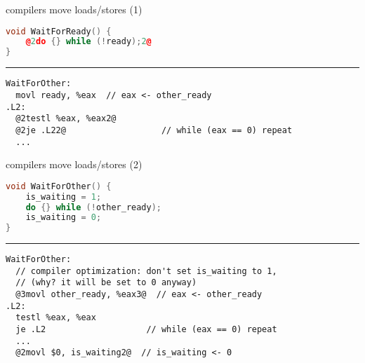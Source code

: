 \begin{frame}[fragile,label=compReorder]{compilers move loads/stores (1)}
\begin{lstlisting}[language=C++,style=small,
    moredelim={**[is][\btHL<2|handout:2>]{@2}{2@}},
    moredelim={**[is][\btHL<3|handout:3>]{@3}{3@}},
    moredelim={**[is][\btHL<4|handout:4>]{@4}{4@}},
    moredelim={**[is][\btHL<5|handout:5>]{@5}{5@}},
]
void WaitForReady() {
    @2do {} while (!ready);2@
}
\end{lstlisting}
\hrule
\begin{lstlisting}[language=myasm,style=smaller,
    moredelim={**[is][\btHL<2|handout:2>]{@2}{2@}},
    moredelim={**[is][\btHL<3|handout:3>]{@3}{3@}},
    moredelim={**[is][\btHL<4|handout:4>]{@4}{4@}},
    moredelim={**[is][\btHL<5|handout:5>]{@5}{5@}},
]
WaitForOther:
  movl ready, %eax  // eax <- other_ready
.L2:
  @2testl %eax, %eax2@
  @2je .L22@                   // while (eax == 0) repeat
  ...
\end{lstlisting}
\end{frame}

\begin{frame}[fragile,label=compReorder2]{compilers move loads/stores (2)}
\begin{lstlisting}[language=C++,style=small,
    moredelim={**[is][\btHL<2|handout:2>]{@2}{2@}},
    moredelim={**[is][\btHL<3|handout:3>]{@3}{3@}},
    moredelim={**[is][\btHL<4|handout:4>]{@4}{4@}},
    moredelim={**[is][\btHL<5|handout:5>]{@5}{5@}},
]
void WaitForOther() {
    is_waiting = 1;
    do {} while (!other_ready);
    is_waiting = 0;
}
\end{lstlisting}
\hrule
\begin{lstlisting}[language=myasm,style=small,
    moredelim={**[is][\btHL<2|handout:2>]{@2}{2@}},
    moredelim={**[is][\btHL<3|handout:3>]{@3}{3@}},
    moredelim={**[is][\btHL<4|handout:4>]{@4}{4@}},
    moredelim={**[is][\btHL<5|handout:5>]{@5}{5@}},
]
WaitForOther:  
  // compiler optimization: don't set is_waiting to 1,
  // (why? it will be set to 0 anyway)
  @3movl other_ready, %eax3@  // eax <- other_ready
.L2:
  testl %eax, %eax          
  je .L2                    // while (eax == 0) repeat
  ...
  @2movl $0, is_waiting2@  // is_waiting <- 0
\end{lstlisting}
\end{frame}

